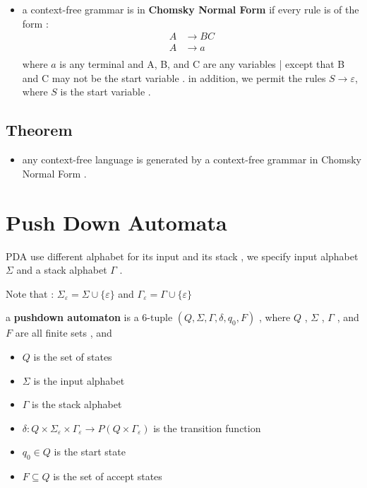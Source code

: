 \documentclass[12pt]{article}
\let\epsilon\varepsilon
\begin{document}
\begin{tcolorbox}
\begin{itemize}
	\item a context-free grammar is in \textbf{Chomsky Normal Form} if every rule is of the form :
	\begin{align*}
	A &\to BC \\
	A &\to a \\
	\end{align*}
	where $a$ is any terminal and A, B, and C are any variables | except that B and C may not be the start variable . in addition, we permit the rules $S \to \epsilon$, where $S$ is the start variable .
\end{itemize}
\end{tcolorbox}


\subsection{Theorem}

\begin{tcolorbox}
\begin{itemize}
	\item any context-free language is generated by a context-free grammar in Chomsky Normal Form .
\end{itemize}
\end{tcolorbox}



\newpage

\section{Push Down Automata}

PDA use different alphabet for its input and its stack , we specify input alphabet $\Sigma$ and a stack alphabet $\Gamma$ .

\noindent
Note that :
$\Sigma_{\epsilon} = \Sigma \cup \{ \epsilon \} $ and
$\Gamma_{\epsilon} = \Gamma \cup \{ \epsilon \} $ 




\begin{tcolorbox}
a \textbf{pushdown automaton} is a 6-tuple $( Q , \Sigma , \Gamma , \delta , q_{0} , F )$ , where $Q$ , $\Sigma$ , $\Gamma$ , and $F$ are all finite sets , and 
\begin{itemize}
	\item $Q$ is the set of states
	\item $\Sigma$ is the input alphabet
	\item $\Gamma$ is the stack alphabet
	\item $\delta :  Q \times \Sigma_{\epsilon} \times \Gamma_{\epsilon} \to P(Q \times \Gamma_{\epsilon})$ is the transition function
	\item $q_{0} \in Q$ is the start state
	\item $F \subseteq Q$ is the set of accept states
\end{itemize}
\end{tcolorbox}
\end{document}
